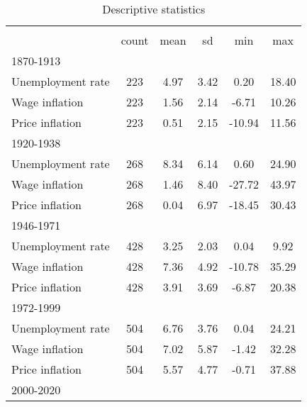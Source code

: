 \begin{table}[htbp]\centering
\def\sym#1{\ifmmode^{#1}\else\(^{#1}\)\fi}
\caption{Descriptive statistics \label{T:DescriptivesW}}
\begin{tabular}{l*{1}{ccccc}}
\hline\hline
                    &\multicolumn{5}{c}{}                                            \\
                    &       count&        mean&          sd&         min&         max\\
\hline
1870-1913           &            &            &            &            &            \\
Unemployment rate   &         223&        4.97&        3.42&        0.20&       18.40\\
Wage inflation      &         223&        1.56&        2.14&       -6.71&       10.26\\
Price inflation     &         223&        0.51&        2.15&      -10.94&       11.56\\
\hline
1920-1938           &            &            &            &            &            \\
Unemployment rate   &         268&        8.34&        6.14&        0.60&       24.90\\
Wage inflation      &         268&        1.46&        8.40&      -27.72&       43.97\\
Price inflation     &         268&        0.04&        6.97&      -18.45&       30.43\\
\hline
1946-1971           &            &            &            &            &            \\
Unemployment rate   &         428&        3.25&        2.03&        0.04&        9.92\\
Wage inflation      &         428&        7.36&        4.92&      -10.78&       35.29\\
Price inflation     &         428&        3.91&        3.69&       -6.87&       20.38\\
\hline
1972-1999           &            &            &            &            &            \\
Unemployment rate   &         504&        6.76&        3.76&        0.04&       24.21\\
Wage inflation      &         504&        7.02&        5.87&       -1.42&       32.28\\
Price inflation     &         504&        5.57&        4.77&       -0.71&       37.88\\
\hline
2000-2020           &            &            &            &            &            \\

\end{tabular}
\end{table}
